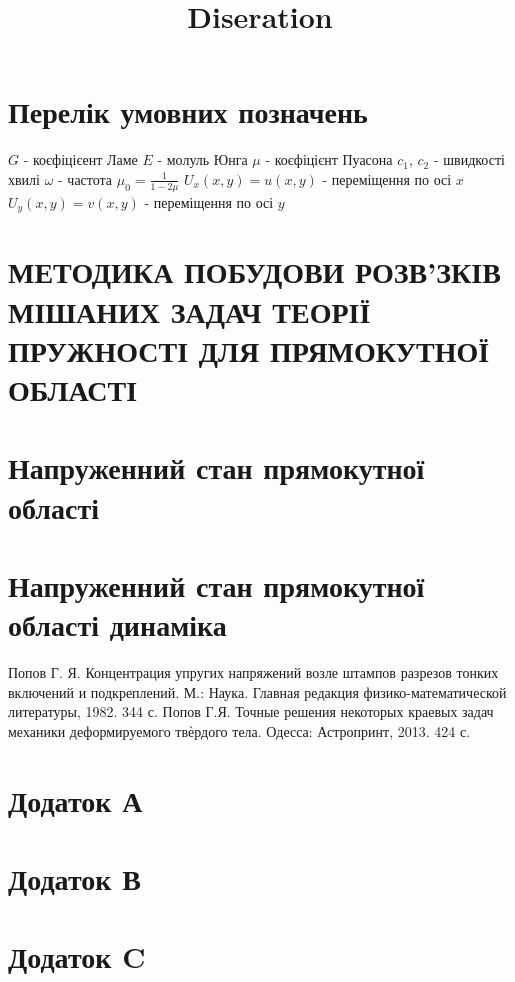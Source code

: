 \documentclass[a4paper,10pt]{extarticle}
\title{Diseration}
\author{}
\date{}
\numberwithin{equation}{section}
\begin{document}
\newpage

\renewcommand{\contentsname}{\centering Зміст}
\tableofcontents

\newpage

\section*{\centering Перелік умовних позначень}
$G$ - коєфіцієент Ламе \newline
$E$ - молуль Юнга \newline
$\mu$ - коєфіцієнт Пуасона \newline
$c_1$, $c_2$ - швидкості хвилі \newline
$\omega$ - частота \newline
$\mu_0 = \frac{1}{1 - 2\mu}$ \newline
$U_x(x,y) = u(x,y)$ - переміщення по осі $x$ \newline
$U_y(x,y) = v(x,y)$ - переміщення по осі $y$

\section{МЕТОДИКА ПОБУДОВИ РОЗВ’ЗКІВ МІШАНИХ ЗАДАЧ
ТЕОРІЇ ПРУЖНОСТІ ДЛЯ ПРЯМОКУТНОЇ ОБЛАСТІ}


\section{Напруженний стан прямокутної області}


\section{Напруженний стан прямокутної області динаміка}


\begin{thebibliography}{1}
    Попов Г. Я. Концентрация упругих напряжений возле штампов разрезов тонких включений и подкреплений. М.: Наука. Главная редакция физико-математической литературы, 1982. 344 с.
    Попов Г.Я. Точные решения некоторых краевых задач механики деформируемого твѐрдого тела. Одесса: Астропринт, 2013. 424 с.

\end{thebibliography}

\section{Додаток А}\label{ap_A}


\section{Додаток В}\label{ap_B}


\section{Додаток C}\label{ap_C}

\end{document}

